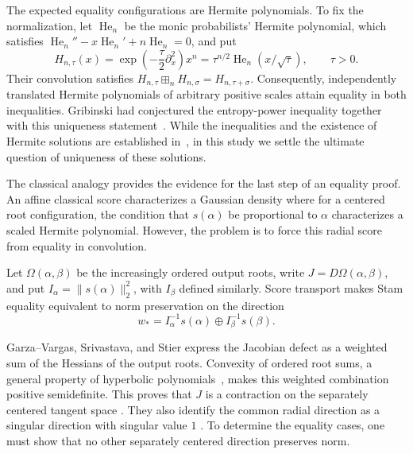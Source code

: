 \documentclass[12pt,reqno]{amsart}
\theoremstyle{definition}
\theoremstyle{remark}
\newcommand{\He}{\operatorname{He}}
\begin{document}
The expected equality configurations are Hermite polynomials.  To fix the
normalization, let \(\He_n\) be the monic probabilists' Hermite polynomial,
which satisfies \(\He_n''-x\He_n'+n\He_n=0\), and put
\begin{equation}\label{eq:intro-heat-hermite}
 H_{n,\tau}(x)=\exp\!\left(-\frac{\tau}{2}\partial_x^2\right)x^n
             =\tau^{n/2}\He_n(x/\sqrt\tau),\qquad \tau>0.
\end{equation}
Their convolution satisfies
\(H_{n,\tau}\boxplus_nH_{n,\sigma}=H_{n,\tau+\sigma}\).
Consequently, independently translated Hermite polynomials of arbitrary
positive scales attain equality in both inequalities.  Gribinski had
conjectured the entropy-power inequality together with this uniqueness
statement~\cite[Conjecture~1]{Gribinski19}.  While the inequalities and the existence of Hermite solutions are established in~\cite{GVS26}, in this study we settle the ultimate question of uniqueness of these solutions. 

The classical analogy provides the evidence for the last step of an equality proof. An affine classical score characterizes a Gaussian density
\cite{Stam59,Blachman65,Carlen91} where for a centered root configuration,
the condition that \(s(\alpha)\) be proportional to \(\alpha\)
characterizes a scaled Hermite polynomial. However, the problem is to force this radial score from equality in convolution.

Let \(\Omega(\alpha,\beta)\) be the increasingly ordered output roots,
write \(J=D\Omega(\alpha,\beta)\), and put
\(I_\alpha=\|s(\alpha)\|_2^2\), with \(I_\beta\) defined
similarly.  Score transport makes Stam equality equivalent to norm
preservation on the direction
\begin{equation}\label{eq:intro-optimal-score-direction}
 w_* = I_\alpha^{-1}s(\alpha)\oplus I_\beta^{-1}s(\beta).
\end{equation}

Garza--Vargas, Srivastava, and Stier express the Jacobian defect as a weighted sum of the Hessians of the output roots. Convexity of ordered root sums, a general property of hyperbolic polynomials~\cite[Corollary~3.3]{BGLS01}, makes this weighted combination positive semidefinite. This proves that \(J\) is a
contraction on the separately centered tangent space \cite[Lemmas~5.1--5.2 and Proposition~5.3]{GVS26}. They also identify the common radial direction as a singular direction with singular value \(1\) \cite[Remark~5.4]{GVS26}.
To determine the equality cases, one must show that no other separately centered direction preserves norm.
\end{document}
